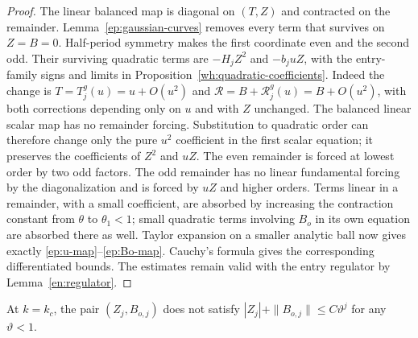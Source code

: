 \begin{proof}
The linear balanced map is diagonal on $(T,Z)$ and contracted
on the remainder.  Lemma~\ref{ep:gaussian-curves} removes
every term that survives on $Z=B=0$.
Half-period symmetry makes the first coordinate even and
the second odd.  Their surviving quadratic terms are
$-H_jZ^2$ and $-b_juZ$, with the entry-family signs and limits in
Proposition~\ref{wh:quadratic-coefficients}.  Indeed the change is
$T=T_j^g(u)=u+O(u^2)$ and
$\mathcal R=B+\mathcal R_j^g(u)=B+O(u^2)$, with both corrections
depending only on $u$ and with $Z$ unchanged.  The balanced linear
scalar map has no remainder forcing.  Substitution to quadratic order
can therefore change only the pure $u^2$ coefficient in the first
scalar equation; it preserves the coefficients of $Z^2$ and $uZ$.
The even remainder is forced at lowest order by two odd
factors.  The odd remainder has no linear fundamental forcing
by the diagonalization and is forced by $uZ$ and higher
orders.  Terms linear in a remainder, with a small
coefficient, are absorbed by increasing the contraction
constant from $\theta$ to $\theta_1<1$; small quadratic
terms involving $B_o$ in its own equation are absorbed there
as well.  Taylor expansion on a smaller analytic ball now
gives exactly \eqref{ep:u-map}--\eqref{ep:Bo-map}.
Cauchy's formula gives the corresponding differentiated
bounds.  The estimates remain valid with the entry
regulator by Lemma~\ref{en:regulator}.
\end{proof}

\begin{lemma}
\label{ep:odd-nonexponential}
At $k=k_c$, the pair $(Z_j,B_{o,j})$ does not satisfy
$|Z_j|+\|B_{o,j}\|\le C\vartheta^j$ for any
$\vartheta<1$.
\end{lemma}

